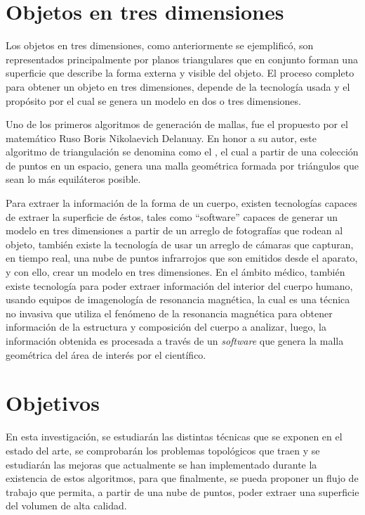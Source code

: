 \section{Objetos en tres dimensiones}
\label{sec:objectosEnTresDimensiones}
Los objetos en tres dimensiones, como anteriormente se ejemplificó, son representados
principalmente por planos triangulares que en conjunto forman una superficie que describe la
forma externa y visible del objeto. El proceso completo para obtener un objeto en tres dimensiones, depende de la tecnología usada y el propósito por el cual se genera un modelo en
dos o tres dimensiones.

Uno de los primeros algoritmos de generación de mallas, fue el propuesto por el
matemático Ruso Boris Nikolaevich Delanuay. En honor a su autor, este algoritmo de
triangulación se denomina como el , el cual a partir de
una colección de puntos en un espacio, genera una malla geométrica formada por triángulos que
sean lo más equiláteros posible.

Para extraer la información de la forma de un cuerpo, existen tecnologías capaces de
extraer la superficie de éstos, tales como “software” capaces de generar un modelo en tres
dimensiones a partir de un arreglo de fotografías que rodean al objeto, también existe la
tecnología de usar un arreglo de cámaras que capturan, en tiempo real, una nube de puntos
infrarrojos que son emitidos desde el aparato, y con ello, crear un modelo en tres dimensiones. En
el ámbito médico, también existe tecnología para poder extraer información del interior del
cuerpo humano, usando equipos de imagenología de resonancia magnética, la cual es una técnica
no invasiva que utiliza el fenómeno de la resonancia magnética para obtener información de la
estructura y composición del cuerpo a analizar, luego, la información obtenida es procesada a
través de un \emph{software} que genera la malla geométrica del área de interés por el científico.

\section{Objetivos}
\label{sec:objetivos}
En esta investigación, se estudiarán las distintas técnicas que se exponen en el estado del arte, %
se comprobarán los problemas topológicos que traen y se estudiarán las mejoras que actualmente se
han implementado durante la existencia de estos algoritmos, para que finalmente, se pueda proponer
un flujo de trabajo que permita, a partir de una nube de puntos, poder extraer una superficie del
volumen de alta calidad.